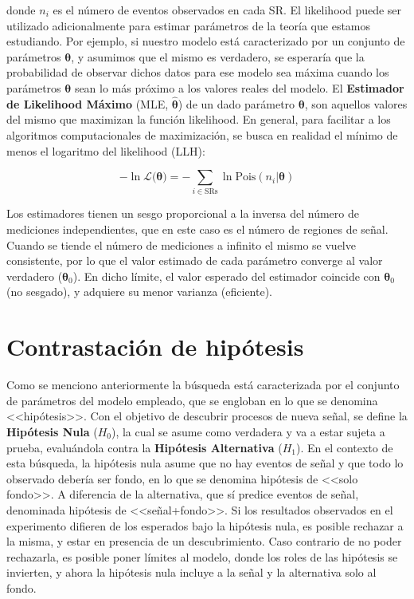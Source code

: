 \noindent donde $n_i$ es el número de eventos observados en cada SR. 
El likelihood puede ser utilizado adicionalmente para estimar parámetros de la teoría que estamos estudiando. Por ejemplo, si nuestro modelo está caracterizado por un conjunto de parámetros $\bm{\theta}$, y asumimos que el mismo es verdadero, se esperaría que la probabilidad de observar dichos datos para ese modelo sea máxima cuando los parámetros $\bm{\theta}$ sean lo más próximo a los valores reales del modelo. El \textbf{Estimador de Likelihood Máximo} (MLE, $\hat{\bm{\theta}}$) de un dado parámetro $\bm{\theta}$, son aquellos valores del mismo que maximizan la función likelihood. En general, para facilitar a los algoritmos computacionales de maximización, se busca en realidad el mínimo de menos el logaritmo del likelihood (LLH):

\begin{equation}
	-\ln{\mathcal{L}(\bm{\theta}}) = - \sum_{i\in \text{SRs}}\ln{\text{Pois}(n_i|\bm{\theta})}
\end{equation}

Los estimadores tienen un sesgo proporcional a la inversa del número de mediciones independientes, que en este caso es el número de regiones de señal. Cuando se tiende el número de mediciones a infinito el mismo se vuelve consistente, por lo que el valor estimado de cada parámetro converge al valor verdadero ($\bm{\theta}_0$). En dicho límite, el valor esperado del estimador coincide con $\bm{\theta}_0$ (no sesgado), y adquiere su menor varianza (eficiente).



\section{Contrastación de hipótesis}

Como se menciono anteriormente la búsqueda está caracterizada por el conjunto de parámetros del modelo empleado, que se engloban en lo que se denomina <<hipótesis>>. Con el objetivo de descubrir procesos de nueva señal, se define la \textbf{Hipótesis Nula} ($H_0$), la cual se asume como verdadera y va a estar sujeta a prueba, evaluándola contra la \textbf{Hipótesis Alternativa} ($H_1$). En el contexto de esta búsqueda, la hipótesis nula asume que no hay eventos de señal y que todo lo observado debería ser fondo, en lo que se denomina hipótesis de <<solo fondo>>. A diferencia de la alternativa, que sí predice eventos de señal, denominada hipótesis de <<señal+fondo>>. Si los resultados observados en el experimento difieren de los esperados bajo la hipótesis nula, es posible rechazar a la misma, y estar en presencia de un descubrimiento. Caso contrario de no poder rechazarla, es posible poner límites al modelo, donde los roles de las hipótesis se invierten, y ahora la hipótesis nula incluye a la señal y la alternativa solo al fondo.


